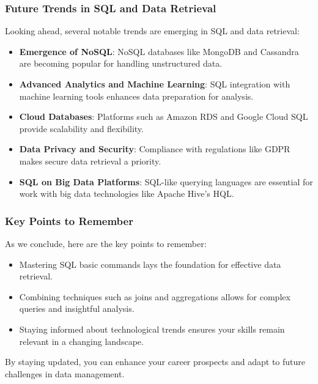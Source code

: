 \documentclass[aspectratio=169]{beamer}
\begin{document}
\begin{frame}[fragile]
    \frametitle{Future Trends in SQL and Data Retrieval}
    Looking ahead, several notable trends are emerging in SQL and data retrieval:
    \begin{itemize}
        \item \textbf{Emergence of NoSQL}: NoSQL databases like MongoDB and Cassandra are becoming popular for handling unstructured data.
        
        \item \textbf{Advanced Analytics and Machine Learning}: SQL integration with machine learning tools enhances data preparation for analysis.
        
        \item \textbf{Cloud Databases}: Platforms such as Amazon RDS and Google Cloud SQL provide scalability and flexibility.
        
        \item \textbf{Data Privacy and Security}: Compliance with regulations like GDPR makes secure data retrieval a priority.
        
        \item \textbf{SQL on Big Data Platforms}: SQL-like querying languages are essential for work with big data technologies like Apache Hive’s HQL.
    \end{itemize}
\end{frame}

\begin{frame}[fragile]
    \frametitle{Key Points to Remember}
    As we conclude, here are the key points to remember:
    \begin{itemize}
        \item Mastering SQL basic commands lays the foundation for effective data retrieval.
        \item Combining techniques such as joins and aggregations allows for complex queries and insightful analysis.
        \item Staying informed about technological trends ensures your skills remain relevant in a changing landscape.
    \end{itemize}
    By staying updated, you can enhance your career prospects and adapt to future challenges in data management.
\end{frame}
\end{document}
